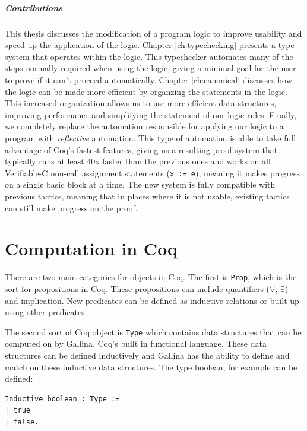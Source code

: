 \documentclass{puthesis}
\begin{document}
\paragraph{Contributions}
This thesis discusses the modification of a program logic to improve
usability and speed up the application of the logic. Chapter
\ref{ch:typechecking} presents a type system that operates within the
logic. This typechecker automates many of the steps normally required
when using the logic, giving a minimal goal for the user to prove if
it can't proceed automatically. Chapter \ref{ch:canonical} discusses
how the logic can be made more efficient by organzing the statements
in the logic. This increased organization allows us to use more
efficient data structures, improving performance and simplifying the
statement of our logic rules. Finally, we completely replace the
automation responsible for applying our logic to a program with
\emph{reflective} automation. This type of automation is able to take
full advantage of Coq's fastest features, giving us a resulting proof
system that typically runs at least 40x faster than the previous ones
and works on all Verifiable-C non-call assignment statements
(\lstinline|x := e|), meaning it makes progress on a single basic
block at a time. The new system is fully compatible with previous
tactics, meaning that in places where it is not usable, existing
tactics can still make progress on the proof.

\chapter{Computation in Coq}
\label{ch:computation}

There are two main categories for objects in Coq. The first is
\lstinline|Prop|, which is the sort for propositions in Coq. These
propositions can include quantifiers ($\forall$, $\exists$) and
implication. New predicates can be defined as inductive relations or
built up using other predicates. 

The second sort of Coq object is \lstinline|Type| which contains data
structures that can be computed on by Gallina, Coq's built in
functional language. These data structures can be defined inductively
and Gallina has the ability to define and match on these inductive
data structures. The type boolean, for example can be defined:

\begin{lstlisting}
Inductive boolean : Type :=
| true
| false.
\end{lstlisting}
\end{document}
